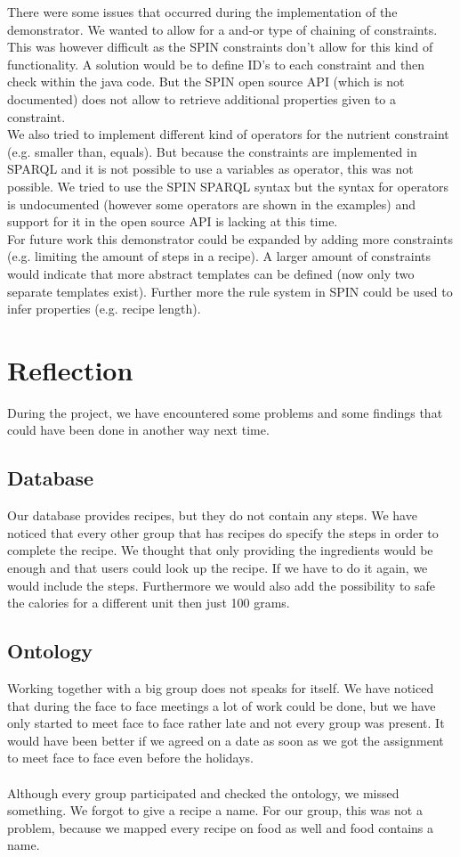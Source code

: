 There were some issues that occurred during the implementation of the demonstrator. We wanted to allow for a and-or type of chaining of constraints. This was however difficult as the SPIN constraints don't allow for this kind of functionality. A solution would be to define ID's to each constraint and then check within the java code. But the SPIN open source API (which is not documented) does not allow to retrieve additional properties given to a constraint.\\
We also tried to implement different kind of operators for the nutrient constraint (e.g. smaller than, equals). But because the constraints are implemented in SPARQL and it is not possible to use a variables as operator, this was not possible. We tried to use the SPIN SPARQL syntax but the syntax for operators is undocumented (however some operators are shown in the examples) and support for it in the open source API is lacking at this time.\\
For future work this demonstrator could be expanded by adding more constraints (e.g. limiting the amount of steps in a recipe). A larger amount of constraints would indicate that more abstract templates can be defined (now only two separate templates exist). Further more the rule system in SPIN could be used to infer properties (e.g. recipe length).

\section{Reflection}
During the project, we have encountered some problems and some findings that could have been done in another way next time. 
\subsection*{Database} 
Our database provides recipes, but they do not contain any steps. We have noticed that every other group that has recipes do specify the steps in order to complete the recipe. We thought that only providing the ingredients would be enough and that users could look up the recipe. If we have to do it again, we would include the steps. Furthermore we would also add the possibility to safe the calories for a different unit then just 100 grams. 
\subsection*{Ontology} 
Working together with a big group does not speaks for itself. We have noticed that during the face to face meetings a lot of work could be done, but we have only started to meet face to face rather late and not every group was present. It would have been better if we agreed on a date as soon as we got the assignment to meet face to face even before the holidays.  
\\ \\ 
Although every group participated and checked the ontology, we missed something. We forgot to give a recipe a name. For our group, this was not a problem, because we mapped every recipe on food as well and food contains a name. 
